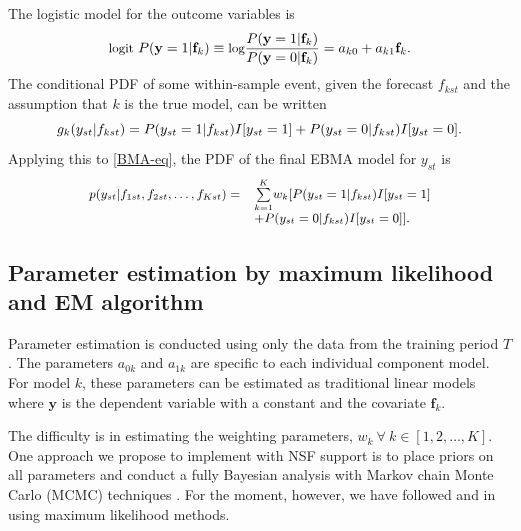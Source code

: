 \documentclass[pdftex,12pt,fullpage,oneside]{amsart}
\begin{document}
The logistic model for the outcome variables is %
\begin{equation} \small
\label{one}
\mbox{logit } P(\mathbf{y}=1|\mathbf{f}_k) \equiv \mbox{log}\frac{P(\mathbf{y}=1|\mathbf{f}_k)}{P(\mathbf{y}=0|\mathbf{f}_k)} = a_{k0}+a_{k1}\mathbf{f}_k .
\end{equation}
\noindent The conditional PDF of some within-sample event, given the
forecast $f_{kst}$ and the assumption that $k$ is the true model, can
be written
\begin{equation} 
\label{component-eq}
\small
g_k(y_{st}|f_{kst}) = P(y_{st}=1|f_{kst})I[y_{st}=1]  + P(y_{st}=0|f_{kst})I[y_{st}=0].
\end{equation}
Applying this to \eqref{BMA-eq}, the PDF of the final EBMA model for
$y_{st}$ is
\begin{equation}
\label{pdf}
\small
\begin{array}{rl}
p(y_{st}|f_{1st}, f_{2st}, \ldots, f_{Kst}) = &
\overset{K}{\underset{k=1}{\sum}} w_k [
P(y_{st}=1|f_{kst})I[y_{st}=1] \\
& + P(y_{st}=0|f_{kst})I[y_{st}=0]].\end{array}
\end{equation}

\subsection{Parameter estimation by maximum likelihood and EM
algorithm}

Parameter estimation is conducted using only the data from the
training period $T$.  The parameters $a_{0k}$ and $a_{1k}$ are
specific to each individual component model.  For model $k$, these
parameters can be estimated as traditional linear models where
$\mathbf{y}$ is the dependent variable with a constant and the covariate $\mathbf{f}_k$.

The difficulty is in estimating the weighting parameters,
$w_k~\forall~ k \in [1, 2, \dots, K]$. One approach we
propose to implement with NSF support is to place priors on all
parameters and conduct a fully Bayesian analysis with Markov chain
Monte Carlo (MCMC) techniques \citep[c.f.][]{Vrugt:2008}.  For the moment,
however, we have followed \citet{Raftery:2005} and
\citet{Sloughter:2007} in using maximum likelihood methods.
\end{document}
